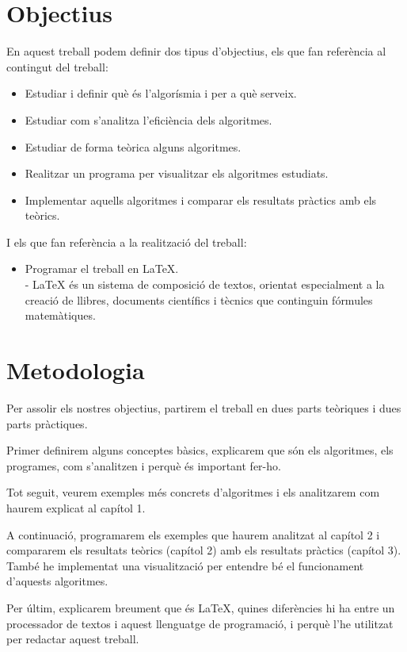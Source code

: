 \section*{Objectius}
En aquest treball podem definir dos tipus d'objectius, els que fan referència al contingut del treball:
\begin{itemize}
    \item Estudiar i definir què és l'algorísmia i per a què serveix. 
    \item Estudiar com s'analitza l'eficiència dels algoritmes.
    \item Estudiar de forma teòrica alguns algoritmes.
    \item Realitzar un programa per visualitzar els algoritmes estudiats.
    \item Implementar aquells algoritmes i comparar els resultats pràctics amb els teòrics.
\end{itemize}
I els que fan referència a la realització del treball:
\begin{itemize}
    \item Programar el treball en \LaTeX. \\
    - LaTeX és un sistema de composició de textos, orientat especialment a la creació de llibres, documents científics i tècnics que continguin fórmules matemàtiques. 
\end{itemize}

\section*{Metodologia}
Per assolir els nostres objectius, partirem el treball en dues parts teòriques i dues parts pràctiques.

Primer definirem alguns conceptes bàsics, explicarem que són els algoritmes, els programes, com s'analitzen i perquè és important fer-ho.

Tot seguit, veurem exemples més concrets d'algoritmes i els analitzarem com haurem explicat al capítol 1.

A continuació, programarem els exemples que haurem analitzat al capítol 2 i compararem els resultats teòrics (capítol 2) amb els resultats pràctics (capítol 3). També he implementat una visualització per entendre bé el funcionament d'aquests algoritmes.

Per últim, explicarem breument que és \LaTeX \space, quines diferències hi ha entre un processador de textos i aquest llenguatge de programació, i perquè l'he utilitzat per redactar aquest treball.